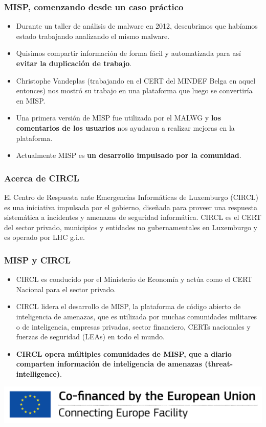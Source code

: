 
\begin{frame}[t,plain]
\titlepage
\end{frame}

\begin{frame}
 \frametitle{MISP, comenzando desde un caso práctico}
 \begin{itemize}
         \item Durante un taller de análisis de malware en 2012, descubrimos que habíamos estado trabajando analizando el mismo malware.
         \item Quisimos compartir información de forma fácil y automatizada para así {\bf evitar la duplicación de trabajo}.
         \item Christophe Vandeplas (trabajando en el CERT del MINDEF Belga en aquel entonces) nos mostró su trabajo en una plataforma que luego se convertiría en MISP.
         \item Una primera versión de MISP fue utilizada por el MALWG y {\bf los comentarios de los usuarios} nos ayudaron a realizar mejoras en la plataforma.
         \item Actualmente MISP es {\bf un desarrollo impulsado por la comunidad}.
 \end{itemize}
\end{frame}

\begin{frame}
\frametitle{Acerca de CIRCL}
El Centro de Respuesta ante Emergencias Informáticas de Luxemburgo (CIRCL) es una iniciativa impulsada por el gobierno, diseñada para proveer una respuesta sistemática a incidentes y amenazas de seguridad informática.
\linebreak
\linebreak
CIRCL es el CERT del sector privado, municipios y entidades no gubernamentales en Luxemburgo y es operado por LHC g.i.e.
\end{frame}

\begin{frame}
\frametitle{MISP y CIRCL}
\begin{itemize}
\item CIRCL es conducido por el Ministerio de Economía y actúa como el CERT Nacional para el sector privado.
\item CIRCL lidera el desarrollo de MISP, la plataforma de código abierto de inteligencia de amenazas, que es utilizada por muchas comunidades militares o de inteligencia, empresas privadas, sector financiero, CERTs nacionales y fuerzas de seguridad (LEAs) en todo el mundo.
\item {\bf CIRCL opera múltiples comunidades de MISP, que a diario comparten información de inteligencia de amenazas (threat-intelligence)}.
\end{itemize}
        \includegraphics{en_cef.png}
\end{frame}

